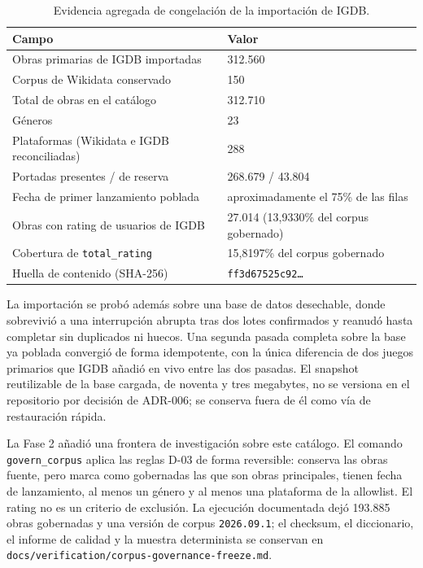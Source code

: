 \begin{table}[htp]
\centering
\begin{tabularx}{\textwidth}{ | Y | Y | }
    \hline
    \textbf{Campo} & \textbf{Valor} \\
    \hline
    Obras primarias de IGDB importadas & 312.560 \\
    \hline
    Corpus de Wikidata conservado & 150 \\
    \hline
    Total de obras en el catálogo & 312.710 \\
    \hline
    Géneros & 23 \\
    \hline
    Plataformas (Wikidata e IGDB reconciliadas) & 288 \\
    \hline
    Portadas presentes / de reserva & 268.679 / 43.804 \\
    \hline
    Fecha de primer lanzamiento poblada & aproximadamente el 75\% de las filas \\
    \hline
    Obras con rating de usuarios de IGDB & 27.014 (13,9330\% del corpus gobernado) \\
    \hline
    Cobertura de \texttt{total\_rating} & 15,8197\% del corpus gobernado \\
    \hline
    Huella de contenido (SHA-256) & \texttt{ff3d67525c92\ldots} \\
    \hline
\end{tabularx}
\caption{Evidencia agregada de congelación de la importación de IGDB.}
\label{tab:freeze}
\end{table}

La importación se probó además sobre una base de datos desechable, donde sobrevivió a una
interrupción abrupta tras dos lotes confirmados y reanudó hasta completar sin duplicados ni
huecos. Una segunda pasada completa sobre la base ya poblada convergió de forma idempotente,
con la única diferencia de dos juegos primarios que IGDB añadió en vivo entre las dos
pasadas. El snapshot reutilizable de la base cargada, de noventa y tres megabytes, no se
versiona en el repositorio por decisión de ADR-006; se conserva fuera de él como vía de
restauración rápida.

La Fase 2 añadió una frontera de investigación sobre este catálogo. El comando
\texttt{govern\_corpus} aplica las reglas D-03 de forma reversible: conserva las obras
fuente, pero marca como gobernadas las que son obras principales, tienen fecha de lanzamiento,
al menos un género y al menos una plataforma de la allowlist. El rating no es un criterio de
exclusión. La ejecución documentada dejó 193.885 obras gobernadas y una versión de corpus
\texttt{2026.09.1}; el checksum, el diccionario, el informe de calidad y la muestra
determinista se conservan en \texttt{docs/verification/corpus-governance-freeze.md}.

